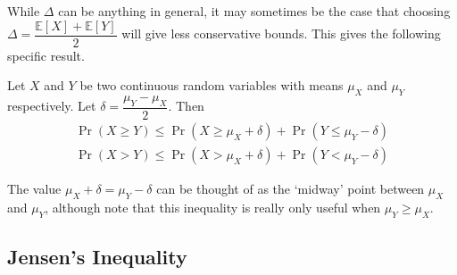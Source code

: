 \documentclass[11pt]{report} %
\begin{document}
While $\Delta$ can be anything in general, it may sometimes be the case that choosing $\Delta = \dfrac{\mathbb{E}\left[X\right] + \mathbb{E}\left[Y\right]}{2}$ will give less conservative bounds. This gives the following specific result.
\begin{corollary}
Let $X$ and $Y$ be two continuous random variables with means $\mu_{X}$ and $\mu_{Y}$ respectively. Let $\delta = \dfrac{\mu_{Y} - \mu_{X}}{2}$. Then
\begin{gather}
\operatorname{Pr}\left(X \geq Y\right) \leq \operatorname{Pr}\left(X \geq \mu_{X} + \delta\right) + \operatorname{Pr}\left(Y \leq \mu_{Y} - \delta\right) \\
\operatorname{Pr}\left(X > Y\right) \leq \operatorname{Pr}\left(X > \mu_{X} + \delta\right) + \operatorname{Pr}\left(Y < \mu_{Y} - \delta\right)
\end{gather}
\end{corollary}
The value $\mu_{X} + \delta = \mu_{Y} - \delta$ can be thought of as the `midway' point between $\mu_{X}$ and $\mu_{Y}$, although note that this inequality is really only useful when $\mu_{Y} \geq \mu_{X}$.

\subsection{Jensen's Inequality}
\end{document}
